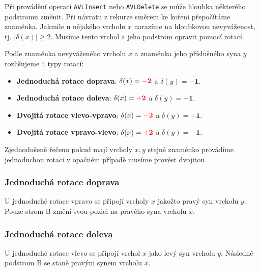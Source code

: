 Při provádění operací \texttt{AVLInsert} nebo \texttt{AVLDelete} se může hloubka některého podstromu změnit. Při návratu z rekurze směrem ke kořeni přepočítáme znaménka. Jakmile u nějakého vrcholu $x$ narazíme na hloubkovou nevyváženost, tj. $|\delta(x)| \ge 2$. Musíme tento vrchol a jeho podstrom opravit pomocí rotací. \medskip

\noindent Podle znaménka nevyváženého vrcholu $x$ a znaménka jeho příslušného syna $y$ rozlišujeme 4 typy rotací:

\begin{itemize}
    \item \textbf{Jednoduchá rotace doprava}: $\delta(x) = \mathbf{\textcolor{red}{-2}}$ a $\delta(y) = \mathbf{-1}$.
    \item \textbf{Jednoduchá rotace doleva}: $\delta(x) = \mathbf{\textcolor{red}{+2}}$ a $\delta(y) = \mathbf{+1}$.
    \item \textbf{Dvojitá rotace vlevo-vpravo}: $\delta(x) = \mathbf{\textcolor{red}{-2}}$ a $\delta(y) = \mathbf{+1}$.
    \item \textbf{Dvojitá rotace vpravo-vlevo}: $\delta(x) = \mathbf{\textcolor{red}{+2}}$ a $\delta(y) = \mathbf{-1}$.
\end{itemize}

\noindent Zjednodušeně řečeno pokud mají vrcholy $x,y$ stejné znaménko provádíme jednoduchou rotaci v opačném případě musíme provést dvojitou. \bigskip

\subsubsection{Jednoduchá rotace doprava}

\noindent U jednoduché rotace vpravo se připojí vrcholy $x$ jakožto pravý syn vrcholu $y$. Pouze strom B změní svou pozici na pravého syna vrcholu $x$.



\bigskip

\subsubsection{Jednoduchá rotace doleva}

\noindent U jednoduché rotace vlevo se připojí vrchol $x$ jako levý syn vrcholu $y$. Následně podstrom B se staně pravým synem vrcholu $x$.


